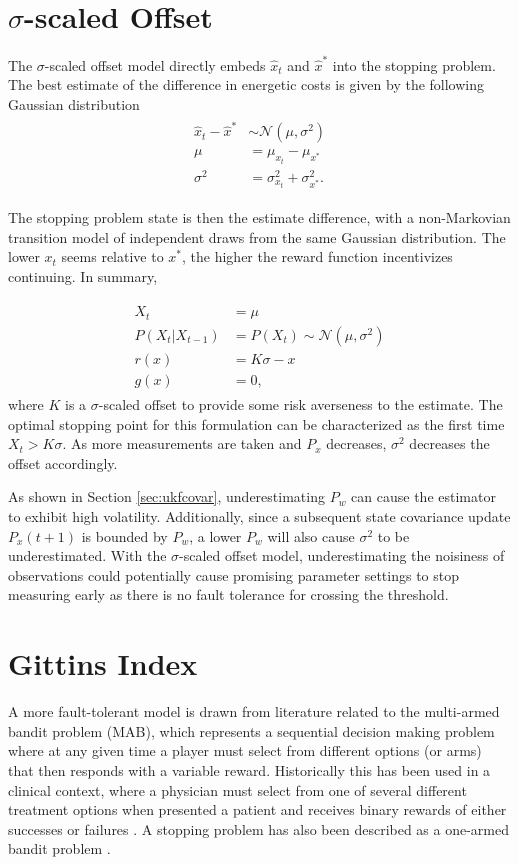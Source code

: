 \section{$\sigma$-scaled Offset}
The $\sigma$-scaled offset model directly embeds $\hat{x}_t$ and $\hat{x}^*$ into the stopping problem. The best estimate of the difference in energetic costs is given by the following Gaussian distribution
\begin{align}
\begin{split}
  \hat{x}_t - \hat{x}^* &\sim \mathcal{N}(\mu, \sigma^2)\\
  \mu &= \mu_{x_t} - \mu_{x^*}\\
  \sigma^2 &= \sigma^2_{x_t} + \sigma^2_{x^*}.
\end{split}
\end{align}

The stopping problem state is then the estimate difference, with a non-Markovian transition model of independent draws from the same Gaussian distribution. The lower $x_t$ seems relative to $x^*$, the higher the reward function incentivizes continuing. In summary,

\begin{align}
\begin{split}
  X_t &= \mu\\
  P(X_t \vert X_{t-1}) &= P(X_t) \sim \mathcal{N}(\mu, \sigma^2)\\
  r(x) &= K\sigma-x\\
  g(x) &= 0,
\end{split}
\end{align}
where $K$ is a $\sigma$-scaled offset to provide some risk averseness to the estimate. The optimal stopping point for this formulation can be characterized as the first time $X_t > K\sigma$. As more measurements are taken and $P_{x}$ decreases, $\sigma^2$ decreases the offset accordingly.

As shown in Section \ref{sec:ukfcovar}, underestimating $P_w$ can cause the estimator to exhibit high volatility. Additionally, since a subsequent state covariance update $P_x(t+1)$ is bounded by $P_w$, a lower $P_w$ will also cause $\sigma^2$ to be underestimated. With the $\sigma$-scaled offset model, underestimating the noisiness of observations could potentially cause promising parameter settings to stop measuring early as there is no fault tolerance for crossing the threshold. 

\section{Gittins Index}
A more fault-tolerant model is drawn from literature related to the multi-armed bandit problem (MAB), which represents a sequential decision making problem where at any given time a player must select from different options (or arms) that then responds with a variable reward. Historically this has been used in a clinical context, where a physician must select from one of several different treatment options when presented a patient and receives binary rewards of either successes or failures \citep{Villar2015}. A stopping problem has also been described as a one-armed bandit problem \citep{FergusonStopping2006}.

